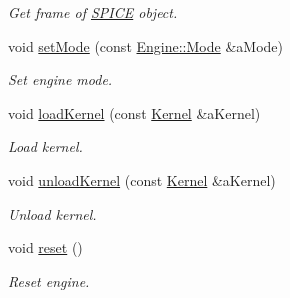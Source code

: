 \begin{DoxyCompactItemize}
\begin{DoxyCompactList}\small\item\em Get frame of \hyperlink{classostk_1_1physics_1_1env_1_1ephem_1_1_s_p_i_c_e}{S\+P\+I\+CE} object. \end{DoxyCompactList}\item 
void \hyperlink{classostk_1_1physics_1_1env_1_1ephem_1_1spice_1_1_engine_a5927d9c72c81334dcb0d8fa9ba20158e}{set\+Mode} (const \hyperlink{classostk_1_1physics_1_1env_1_1ephem_1_1spice_1_1_engine_a803b82d8f41c81e861852098b6b75ae2}{Engine\+::\+Mode} \&a\+Mode)
\begin{DoxyCompactList}\small\item\em Set engine mode. \end{DoxyCompactList}\item 
void \hyperlink{classostk_1_1physics_1_1env_1_1ephem_1_1spice_1_1_engine_aa1aa0d1e376b18899c603950a2d43589}{load\+Kernel} (const \hyperlink{classostk_1_1physics_1_1env_1_1ephem_1_1spice_1_1_kernel}{Kernel} \&a\+Kernel)
\begin{DoxyCompactList}\small\item\em Load kernel. \end{DoxyCompactList}\item 
void \hyperlink{classostk_1_1physics_1_1env_1_1ephem_1_1spice_1_1_engine_a6aa17a14f23f01dddba741a55307b8f9}{unload\+Kernel} (const \hyperlink{classostk_1_1physics_1_1env_1_1ephem_1_1spice_1_1_kernel}{Kernel} \&a\+Kernel)
\begin{DoxyCompactList}\small\item\em Unload kernel. \end{DoxyCompactList}\item 
void \hyperlink{classostk_1_1physics_1_1env_1_1ephem_1_1spice_1_1_engine_ad459dacf25f4ba08089b5d1111ca7814}{reset} ()
\begin{DoxyCompactList}\small\item\em Reset engine. \end{DoxyCompactList}\end{DoxyCompactItemize}

